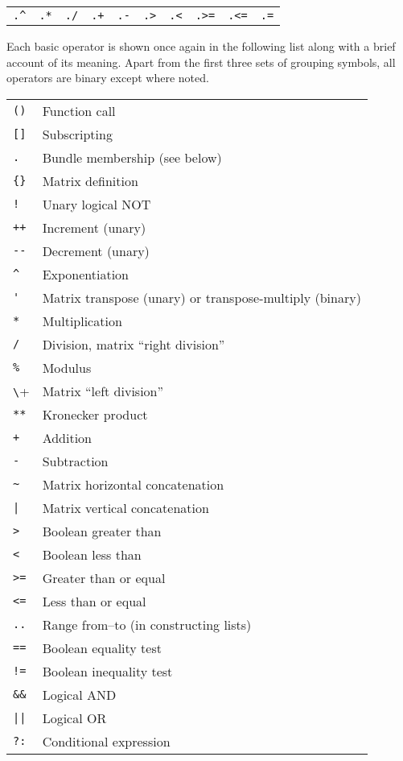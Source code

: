 \begin{center}
\begin{tabular}{cccccccccc}
\verb|.^| & \texttt{.*} & \texttt{./} & \texttt{.+} &
 \texttt{.-} & \verb|.>| & \verb|.<| & \verb|.>=| &
 \verb|.<=| & \texttt{.=} \\
\end{tabular}
\end{center}

Each basic operator is shown once again in the following list along
with a brief account of its meaning. Apart from the first three sets
of grouping symbols, all operators are binary except where noted.

\begin{longtable}{ll}
\verb|()| & Function call \\
\verb|[]|  & Subscripting \\
\texttt{.} & Bundle membership (see below) \\
\verb|{}|  & Matrix definition \\
\texttt{!} & Unary logical NOT \\
\texttt{++} & Increment (unary) \\
\verb|--| & Decrement (unary) \\
\verb|^|  & Exponentiation \\
\verb|'|  & Matrix transpose (unary) or transpose-multiply (binary) \\
\texttt{*} & Multiplication \\
\texttt{/} & Division, matrix ``right division'' \\
\texttt{\%} & Modulus \\
\verb+\+    & Matrix ``left division'' \\
\texttt{**} & Kronecker product \\
\texttt{+} & Addition \\
\texttt{-} & Subtraction \\
\verb|~| & Matrix horizontal concatenation \\
\verb+|+ & Matrix vertical concatenation \\
\verb|>| & Boolean greater than \\
\verb|<| & Boolean less than \\
\verb|>=| & Greater than or equal \\
\verb|<=| & Less than or equal \\
\texttt{..} & Range from--to (in constructing lists) \\
\texttt{==} & Boolean equality test \\
\texttt{!=} & Boolean inequality test \\
\verb|&&| & Logical AND \\
\verb+||+ & Logical OR \\
\texttt{?:} & Conditional expression \\
\end{longtable}


